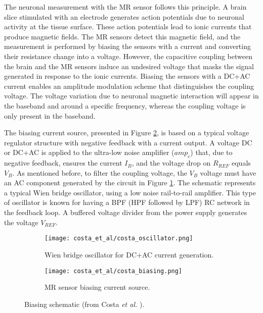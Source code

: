 The neuronal measurement with the \ac{MR} sensor follows this principle. A brain slice stimulated with an electrode generates action potentials due to neuronal activity at the tissue surface. These action potentials lead to ionic currents that produce magnetic fields. The \ac{MR} sensors detect this magnetic field, and the measurement is performed by biasing the sensors with a current and converting their resistance change into a voltage. However, the capacitive coupling between the brain and the \ac{MR} sensors induce an undesired voltage that masks the signal generated in response to the ionic currents. Biasing the sensors with a \ac{DC}+\ac{AC} current enables an amplitude modulation scheme that distinguishes the coupling voltage. The voltage variation due to neuronal magnetic interaction will appear in the baseband and around a specific frequency, whereas the coupling voltage is only present in the baseband.

The biasing current source, presented in Figure \ref{figure:costa-bias}, is based on a typical voltage regulator structure with negative feedback with a current output. A voltage \ac{DC} or \ac{DC}+\ac{AC} is applied to the ultra-low noise amplifier ($amp_c$) that, due to negative feedback, ensures the current $I_B$, and the voltage drop on $R_{REF}$ equals $V_B$. As mentioned before, to filter the coupling voltage, the $V_B$ voltage must have an \ac{AC} component generated by the circuit in Figure \ref{figure:costa-oscillator}. The schematic represents a typical Wien bridge oscillator, using a low noise rail-to-rail amplifier. This type of oscillator is known for having a \ac{BPF} (\ac{HPF} followed by \ac{LPF}) \ac{RC} network in the feedback loop. A buffered voltage divider from the power supply generates the voltage $V_{REF}$.

\begin{figure}[!ht]
    \centering
    \begin{subfigure}[b]{.49\textwidth}
        \centering
        \texttt{[image: costa\_et\_al/costa\_oscillator.png]}
        \caption{Wien bridge oscillator for DC+AC current generation.}
        \label{figure:costa-oscillator}
    \end{subfigure}
    \hfill
    \centering
    \begin{subfigure}[b]{.49\textwidth}
        \centering
        \texttt{[image: costa\_et\_al/costa\_biasing.png]}
        \caption{MR sensor biasing current source.}
        \label{figure:costa-bias}
    \end{subfigure}
    \caption{Biasing schematic (from Costa \textit{et al.} \cite{TIM.2013.2296417}).}
    \label{figure:costa-bias-schematic}
\end{figure}

